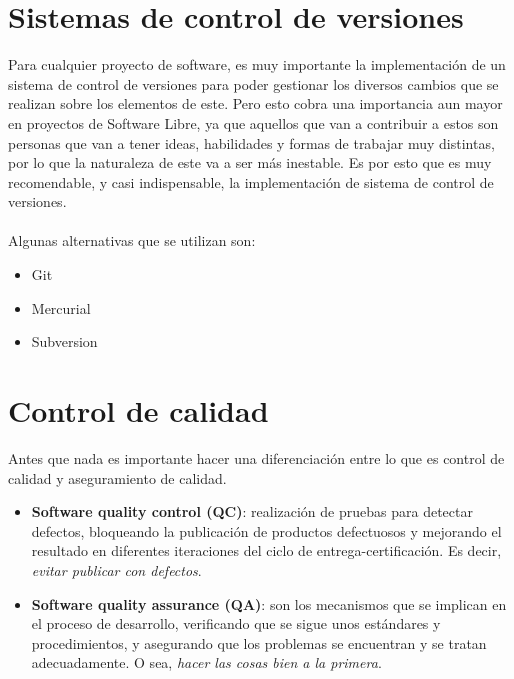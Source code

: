 \section{Sistemas de control de versiones}

Para cualquier proyecto de software, es muy importante la implementación de un sistema de control de versiones para poder gestionar los diversos cambios que se realizan sobre los elementos de este.
Pero esto cobra una importancia aun mayor en proyectos de Software Libre, ya que aquellos que van a contribuir a estos son personas que van a tener ideas, habilidades y formas de trabajar muy distintas, por lo que la naturaleza de este va a ser más inestable.
Es por esto que es muy recomendable, y casi indispensable, la implementación de sistema de control de versiones.
\\
\\
Algunas alternativas que se utilizan son:
\begin{itemize}
    \item Git
    \item Mercurial
    \item Subversion    
\end{itemize}


\section{Control de calidad}

Antes que nada es importante hacer una diferenciación entre lo que es control de calidad y aseguramiento de calidad.

\begin{itemize}
     \item\textbf{Software quality control (QC)}: realización de pruebas para detectar defectos, bloqueando la publicación de productos defectuosos y mejorando el resultado en diferentes iteraciones del ciclo de entrega-certificación. Es decir, \textit{evitar publicar con defectos}.
     \item\textbf{Software quality assurance (QA)}: son los mecanismos que se implican en el proceso de desarrollo, verificando que se sigue unos estándares y procedimientos, y asegurando que los problemas se encuentran y se tratan adecuadamente. O sea, \textit{hacer las cosas bien a la primera}.
\end{itemize}

